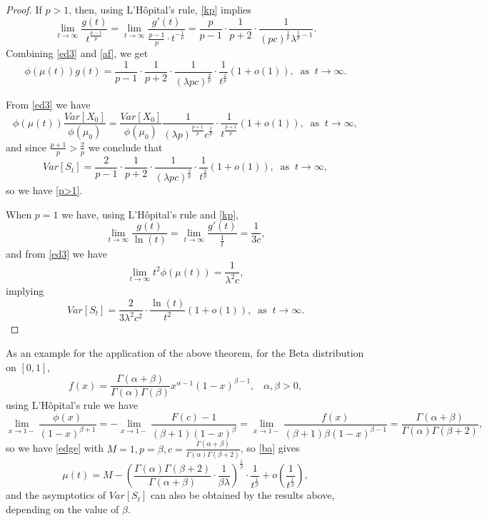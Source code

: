 \documentclass{article}
\numberwithin{equation}{section}
\begin{document}
\begin{proof}
If $p>1$, then, using L'H\^opital's rule, \eqref{kp} implies
\begin{equation}\label{af}\lim_{t\rightarrow\infty}\frac{g(t)}{t^{\frac{p-1}{p}}}=\lim_{t\rightarrow\infty}\frac{g'(t)}{\frac{p-1}{p}\cdot t^{-\frac{1}{p}}}
=\frac{p}{p-1}\cdot \frac{1}{p+2}\cdot \frac{1}{(p c)^{\frac{1}{p}}\lambda^{\frac{1}{p}-1}}.
\end{equation}
Combining \eqref{ed3} and \eqref{af}, we get
$$ \phi(\mu(t))g(t)= \frac{1}{p-1}\cdot \frac{1}{p+2}\cdot \frac{1}{(\lambda pc)^{\frac{2}{p}}}\cdot \frac{1}{t^{\frac{2}{p}}} (1+o(1)),\;\;{\mbox{as}}\;\; t\rightarrow \infty.$$

From \eqref{ed3} we have
$$\phi(\mu(t))\frac{Var[X_0]}{\phi(\mu_0)}=\frac{Var[X_0]}{\phi(\mu_0)}\frac{1}{(\lambda p)^{\frac{p+1}{p} }c^{\frac{1}{p}}}\cdot \frac{1}{t^{\frac{p+1}{p}}}(1+o(1)),\;\;{\mbox{as}}\;\; t\rightarrow \infty,$$
and since $\frac{p+1}{p}>\frac{2}{p}$
we conclude that
$$Var[S_t]=\frac{2}{p-1}\cdot \frac{1}{p+2}\cdot \frac{1}{ (\lambda pc)^{\frac{2}{p}}}\cdot \frac{1}{t^{\frac{2}{p}}} (1+o(1)),\;\;{\mbox{as}}\;\; t\rightarrow \infty,$$
so we have \eqref{p>1}.

When $p=1$ we have, using  L'H\^opital's rule and \eqref{kp},
\begin{equation}\label{af1}\lim_{t\rightarrow\infty}\frac{g(t)}{\ln(t)}=\lim_{t\rightarrow\infty}\frac{g'(t)}{\frac{1}{t}}
=\frac{1}{3 c},
\end{equation}
and from \eqref{ed3} we have
$$\lim_{t\rightarrow \infty} t^2\phi(\mu(t))=\frac{1}{\lambda ^{2}c},$$
implying
$$Var[S_t]=\frac{2}{3\lambda^2 c^2}\cdot \frac{\ln(t)}{t^2}(1+o(1)),\;\;{\mbox{as}}\;\; t\rightarrow \infty.$$


\end{proof}

As an example for the application of the above theorem, for the Beta distribution on $[0,1]$,  \begin{equation}\label{Beta}
f(x)=\frac{\Gamma(\alpha+\beta)}{\Gamma(\alpha)\Gamma(\beta)}x^{\alpha-1}(1-x)^{\beta-1},\;\;\;\alpha,\beta>0,
\end{equation}
using L'H\^opital's rule we have
$$\lim_{x\rightarrow 1-}\frac{\phi(x)}{(1-x)^{\beta+1}}=-
\lim_{x\rightarrow 1-}\frac{F(c)-1}{(\beta+1)(1-x)^{\beta}}
=\lim_{x\rightarrow 1-}\frac{f(x)}{(\beta+1)\beta(1-x)^{\beta-1}}=\frac{\Gamma(\alpha+\beta)}{\Gamma(\alpha)\Gamma(\beta+2)},
$$
so we have \eqref{edge} with 
$M=1,p=\beta,c=\frac{\Gamma(\alpha+\beta)}{\Gamma(\alpha)\Gamma(\beta+2)}$,
so \eqref{ba} gives
\begin{equation}\label{beta}\mu(t)=M-\left(\frac{\Gamma(\alpha)\Gamma(\beta+2)}{\Gamma(\alpha+\beta)}\cdot \frac{1}{\beta \lambda } \right)^{\frac{1}{\beta}}\cdot \frac{1}{t^{\frac{1}{\beta}}}+o\left(\frac{1}{t^{\frac{1}{\beta}}} \right),\end{equation}
and the asymptotics of $Var[S_t]$ can also be obtained by the results above, depending on the value of $\beta$.
\end{document}
